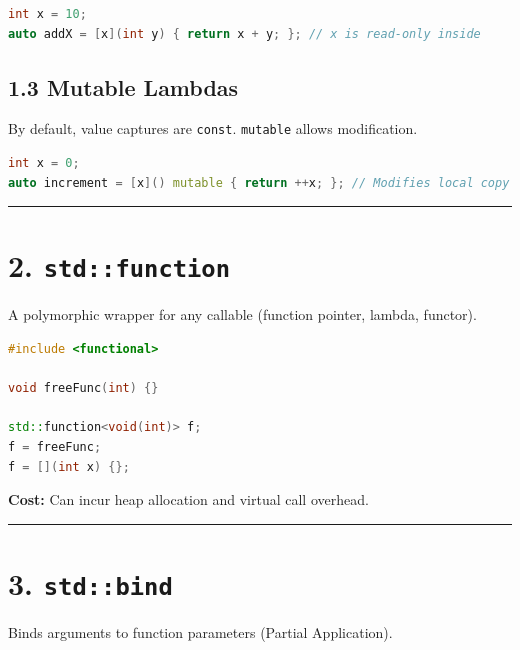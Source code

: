 \begin{lstlisting}[language={C++}]
int x = 10;
auto addX = [x](int y) { return x + y; }; // x is read-only inside
\end{lstlisting}

\hypertarget{mutable-lambdas}{%
\subsection{1.3 Mutable Lambdas}\label{mutable-lambdas}}

By default, value captures are \passthrough{\lstinline!const!}.
\passthrough{\lstinline!mutable!} allows modification.

\begin{lstlisting}[language={C++}]
int x = 0;
auto increment = [x]() mutable { return ++x; }; // Modifies local copy
\end{lstlisting}

\begin{center}\rule{0.5\linewidth}{0.5pt}\end{center}

\hypertarget{stdfunction}{%
\section{\texorpdfstring{2.
\texttt{std::function}}{2. std::function}}\label{stdfunction}}

A polymorphic wrapper for any callable (function pointer, lambda,
functor).

\begin{lstlisting}[language={C++}]
#include <functional>

void freeFunc(int) {}

std::function<void(int)> f;
f = freeFunc;
f = [](int x) {}; 
\end{lstlisting}

\textbf{Cost:} Can incur heap allocation and virtual call overhead.

\begin{center}\rule{0.5\linewidth}{0.5pt}\end{center}

\hypertarget{stdbind}{%
\section{\texorpdfstring{3.
\texttt{std::bind}}{3. std::bind}}\label{stdbind}}

Binds arguments to function parameters (Partial Application).

